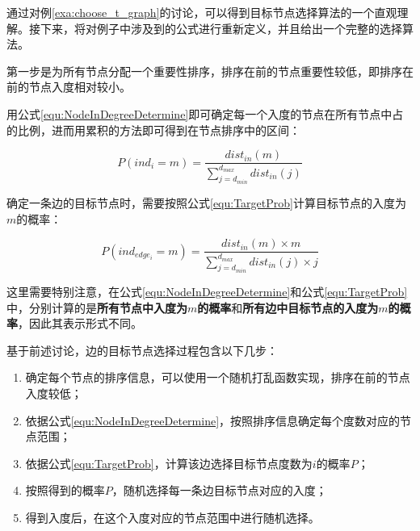 通过对例\ref{exa:choose_t_graph}的讨论，可以得到目标节点选择算法的一个直观理解。接下来，将对例子中涉及到的公式进行重新定义，并且给出一个完整的选择算法。



第一步是为所有节点分配一个重要性排序，排序在前的节点重要性较低，即排序在前的节点入度相对较小。

用公式\ref{equ:NodeInDegreeDetermine}即可确定每一个入度的节点在所有节点中占的比例，进而用累积的方法即可得到在节点排序中的区间：

\vspace{-8mm}

\begin{equation}
  \label{equ:NodeInDegreeDetermine}
  P\left(ind_i=m\right)=\frac{dist_{in}(m)}{\sum\limits_{j=d_{min}}^{d_{max}}dist_{in}(j)}
\end{equation}

确定一条边的目标节点时，需要按照公式\ref{equ:TargetProb}计算目标节点的入度为$m$的概率：

\vspace{-8mm}

\begin{equation}
  \label{equ:TargetProb}
  P\left(ind_{edge_i}=m\right)=\frac{dist_{in}(m) \times m}{\sum\limits_{j=d_{min}}^{d_{max}}dist_{in}(j)\times j}
\end{equation}

这里需要特别注意，在公式\ref{equ:NodeInDegreeDetermine}和公式\ref{equ:TargetProb}中，分别计算的是\textbf{所有节点中入度为$m$的概率}和\textbf{所有边中目标节点的入度为$m$的概率}，因此其表示形式不同。

基于前述讨论，边的目标节点选择过程包含以下几步：

\begin{enumerate}
  \item 确定每个节点的排序信息，可以使用一个随机打乱函数实现，排序在前的节点入度较低；
  \item 依据公式\ref{equ:NodeInDegreeDetermine}，按照排序信息确定每个度数对应的节点范围；
  \item 依据公式\ref{equ:TargetProb}，计算该边选择目标节点度数为$i$的概率$P$；
  \item 按照得到的概率$P$，随机选择每一条边目标节点对应的入度；
  \item 得到入度后，在这个入度对应的节点范围中进行随机选择。
\end{enumerate}

